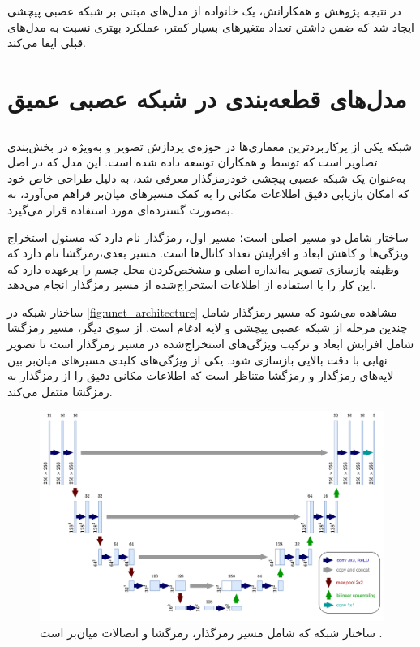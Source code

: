  در نتیجه پژوهش 
  و همکارانش، یک خانواده از مدل‌های مبتنی بر شبکه عصبی پیچشی ایجاد شد که ضمن داشتن تعداد متغیرهای بسیار کمتر، عملکرد بهتری نسبت به مدل‌های قبلی ایفا می‌کند.
 

\section{مدل‌های قطعه‌بندی در شبکه عصبی عمیق}

\subsection{}

شبکه
 یکی از پرکاربردترین معماری‌ها در حوزه‌ی پردازش تصویر و به‌ویژه در بخش‌بندی تصاویر است که توسط
 \cite{ronneberger2015u}
 و همکاران توسعه داده ‌شده است. این مدل که در اصل به‌عنوان یک شبکه عصبی پیچشی خودرمزگذار
   معرفی شد، به دلیل طراحی خاص خود که امکان بازیابی دقیق اطلاعات مکانی را به کمک مسیرهای  میان‌بر فراهم می‌آورد، به به‌صورت گسترده‌ای مورد استفاده قرار می‌گیرد.

ساختار  شامل دو مسیر اصلی است؛ 
مسیر اول، رمزگذار نام دارد که مسئول استخراج ویژگی‌ها و کاهش ابعاد و افزایش تعداد کانال‌ها است.
مسیر بعدی،‌رمزگشا نام دارد که وظیفه بازسازی تصویر به‌اندازه اصلی و مشخص‌کردن محل جسم را برعهده دارد که این کار را با استفاده از اطلاعات استخراج‌شده از مسیر رمزگذار انجام می‌دهد.

ساختار شبکه 
در \autoref{fig:unet_architecture} مشاهده می‌شود که مسیر رمزگذار شامل چندین مرحله از شبکه عصبی پیچشی و لایه ادغام
 است. از سوی دیگر، مسیر رمزگشا شامل افزایش ابعاد و ترکیب ویژگی‌های استخراج‌شده در مسیر رمزگذار است تا تصویر نهایی با دقت بالایی بازسازی شود. یکی از ویژگی‌های کلیدی
  مسیرهای  میان‌بر بین لایه‌های رمزگذار و رمزگشا متناظر است که اطلاعات مکانی دقیق را از رمزگذار به رمزگشا منتقل می‌کند.

\begin{figure}[h]
    \centering
    \includegraphics[width=1\textwidth]{Images/Chapter2/U-Net.drawio.png}
    \caption{ساختار شبکه
      که شامل مسیر رمزگذار، رمزگشا و اتصالات میان‌بر است
    \cite{ronneberger2015u}.}
    \label{fig:unet_architecture}
\end{figure}

